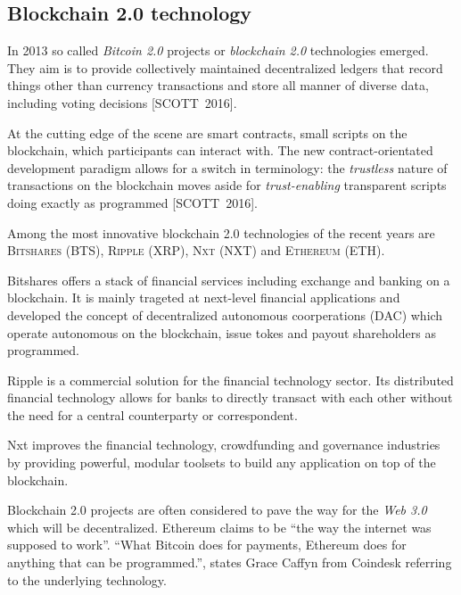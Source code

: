 \documentclass[9pt,oneside]{amsart}
\begin{document}
\begin{multicols}{2}
\subsection{Blockchain 2.0 technology}
In 2013 so called \textit{Bitcoin 2.0} projects or \textit{blockchain 2.0} technologies emerged. They aim is to provide collectively maintained decentralized ledgers that record things other than currency transactions and store all manner of diverse data, including voting decisions [SCOTT~2016].\par
At the cutting edge of the scene are smart contracts, small scripts on the blockchain, which participants can interact with. The new contract-orientated development paradigm allows for a switch in terminology: the \textit{trustless} nature of transactions on the blockchain moves aside for \textit{trust-enabling} transparent scripts doing exactly as programmed [SCOTT~2016].\par
Among the most innovative blockchain 2.0 technologies of the recent years are \textsc{Bitshares (BTS)}, \textsc{Ripple (XRP)}, \textsc{Nxt (NXT)} and \textsc{Ethereum (ETH)}.\par %
Bitshares offers a stack of financial services including exchange and banking on a blockchain. It is mainly trageted at next-level financial applications and developed the concept of decentralized autonomous coorperations (\textsc{DAC}) which operate autonomous on the blockchain, issue tokes and payout shareholders as programmed.\par
Ripple is a commercial solution for the financial technology sector. Its distributed financial technology allows for banks to directly transact with each other without the need for a central counterparty or correspondent.\par
Nxt improves the financial technology, crowdfunding and governance industries by providing powerful, modular toolsets to build any application on top of the blockchain.\par
Blockchain 2.0 projects are often considered to pave the way for the \textit{Web 3.0} which will be decentralized. Ethereum claims to be \enquote{the way the internet was supposed to work}. \enquote{What Bitcoin does for payments, Ethereum does for anything that can be programmed.}, states Grace Caffyn from Coindesk referring to the underlying technology.\par

\end{multicols}
\end{document}
